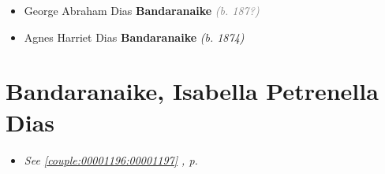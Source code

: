 \documentclass[10pt, openany]{book}
\begin{document}
\begin{itemize}
{\begin{itemize}
{\begin{itemize}
{\begin{itemize}
{\begin{itemize}
\end{itemize}
   }
\end{itemize}}
\end{itemize}
   }
\item{George Abraham Dias \textbf{Bandaranaike} \textcolor{gray}{\textit{(b. 187?)}}
   }
\item{Agnes Harriet Dias \textbf{Bandaranaike} \textcolor{slorange}{\textit{(b. 1874)}}
   }
\end{itemize}}
\end{itemize}
   
\chapter{Bandaranaike, Isabella Petrenella Dias}
\label{00001197}
\textcolor{slmaroon}{\textit{}}
\begin{itemize}
\item{\textcolor{slteal}{\textit{See  \autoref{couple:00001196:00001197} \textit{, p. \pageref{couple:00001196:00001197} }}}}
\end{itemize}
   
\end{document}
